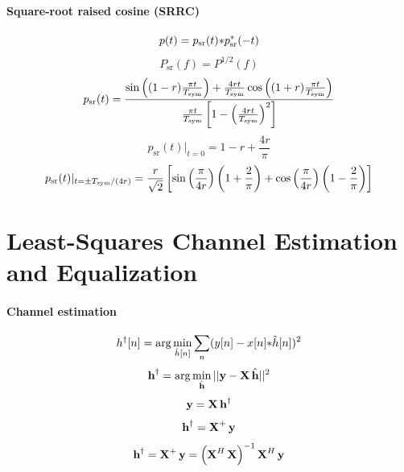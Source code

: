 \paragraph{Square-root raised cosine (SRRC)}
\begin{equation}
p(t) = p_{\textrm{sr}}(t) {\ast} p_{\textrm{sr}}^*(-t)
\label{eq:timeDomainSquareRootRaisedCosine}
\end{equation}
\begin{equation}
P_{\textrm{sr}}(f) = P^{1/2}(f)
\label{eq:squareRootRaisedCosine}
\end{equation}
\begin{equation}
p_{\textrm{sr}}(t) = \frac{ \sin \left( (1-r) \frac{\pi t}{{T_{\textrm{sym}}}} \right) +
\frac{4 r t}{{T_{\textrm{sym}}}} \cos \left( (1+r) \frac{\pi t}{{T_{\textrm{sym}}}} \right) }
{ \frac{\pi t}{{T_{\textrm{sym}}}}  \left[ 1 - \left( \frac{4 r t}{{T_{\textrm{sym}}}} \right)^2 \right] }
\label{eq:sqrtRC}
\end{equation}
\[
p_{\textrm{sr}}(t)|_{t=0} = 1 - r + \frac{4r}{\pi}
\]
\[
p_{\textrm{sr}}(t)|_{t=\pm {T_{\textrm{sym}}} / (4r)} = \frac{r}{\sqrt{2}} \left[ \sin \left( \frac{\pi}{4r }\right)  \left(1 + \frac{2}{\pi}\right) +
\cos \left( \frac{\pi}{4r }\right)  \left(1 - \frac{2}{\pi}\right)  \right]
\]

\section*{Least-Squares Channel Estimation and Equalization}

\paragraph{Channel estimation}
\begin{equation}
h^\dag[n] = \arg \min_{\hat h[n]} \sum_{n} (y[n] - x[n] {\ast} \hat h[n])^2
\label{eq:ls_estimation}
\end{equation}
\begin{equation}
{{\textbf h}}^\dag = \arg \min_{\hat {{\textbf h}}} ||{\textbf y} - {\textbf X} \, \hat {{\textbf h}}||^2
\label{eq:ls_problem}
\end{equation}
\begin{equation}
{\textbf y} = {\textbf X} \, {\textbf h}^\dag
\label{eq:ls_problem_equationsSet}
\end{equation}
\begin{equation}
{{\textbf h}}^\dag = {\textbf X}^{+} \,  {\textbf y}
\label{eq:ls_solution_general}
\end{equation}
\begin{equation}
{{\textbf h}}^\dag = {\textbf X}^{+} \,  {\textbf y} = \left( {\textbf X}^H \, {\textbf X} \right)^{-1}  {\textbf X}^H \,  {\textbf y}
\label{eq:ls_solution}
\end{equation}

